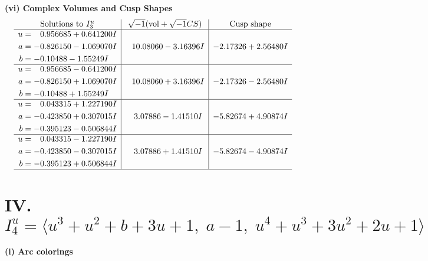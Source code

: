 \documentclass[1p]{elsarticle_modified}
\theoremstyle{definition}
\newcommand{\I}{\sqrt{-1}}
\begin{document}
\newpage\flushleft \textbf{(vi) Complex Volumes and Cusp Shapes}
$$\begin{array}{c|c|c}  
\text{Solutions to }I^u_{3}& \I (\text{vol} + \sqrt{-1}CS) & \text{Cusp shape}\\
 \hline 
\begin{aligned}
u &= \phantom{-}0.956685 + 0.641200 I \\
a &= -0.826150 - 1.069070 I \\
b &= -0.10488 - 1.55249 I\end{aligned}
 & \phantom{-}10.08060 - 3.16396 I & -2.17326 + 2.56480 I \\ \hline\begin{aligned}
u &= \phantom{-}0.956685 - 0.641200 I \\
a &= -0.826150 + 1.069070 I \\
b &= -0.10488 + 1.55249 I\end{aligned}
 & \phantom{-}10.08060 + 3.16396 I & -2.17326 - 2.56480 I \\ \hline\begin{aligned}
u &= \phantom{-}0.043315 + 1.227190 I \\
a &= -0.423850 + 0.307015 I \\
b &= -0.395123 - 0.506844 I\end{aligned}
 & \phantom{-}3.07886 - 1.41510 I & -5.82674 + 4.90874 I \\ \hline\begin{aligned}
u &= \phantom{-}0.043315 - 1.227190 I \\
a &= -0.423850 - 0.307015 I \\
b &= -0.395123 + 0.506844 I\end{aligned}
 & \phantom{-}3.07886 + 1.41510 I & -5.82674 - 4.90874 I\\
 \hline 
 \end{array}$$\newpage\newpage\renewcommand{\arraystretch}{1}
\centering \section*{IV. $I^u_{4}= \langle u^3+u^2+b+3 u+1,\;a-1,\;u^4+u^3+3 u^2+2 u+1 \rangle$}
\flushleft \textbf{(i) Arc colorings}\\
\end{document}
